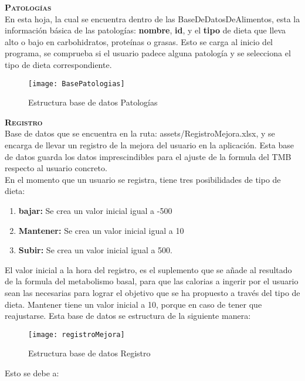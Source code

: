 \textbf{\textsc{Patologías}}\\
En esta hoja, la cual se encuentra dentro de las BaseDeDatosDeAlimentos, esta la información básica de las patologías: \textbf{nombre}, \textbf{id}, y el \textbf{tipo} de dieta que lleva alto o bajo en carbohidratos, proteínas o grasas. Esto se carga al inicio del programa, se comprueba si el usuario padece alguna patología y se selecciona el tipo de dieta correspondiente.\\
\begin{figure}[htb]
\centering
\texttt{[image: BasePatologias]} 
\caption{Estructura base de datos Patologías}
\end{figure}

\textbf{\textsc{Registro}}\\
Base de datos que se encuentra en la ruta: assets/RegistroMejora.xlsx, y se encarga de llevar un registro de la mejora del usuario en la aplicación. Esta base de datos guarda los datos imprescindibles para el ajuste de la formula del TMB respecto al usuario concreto.\\
En el momento que un usuario se registra, tiene tres posibilidades de tipo de dieta:
\begin{enumerate}
\item \textbf{bajar:} Se crea un valor inicial igual a -500
\item \textbf{Mantener:} Se crea un valor inicial igual a 10
\item \textbf{Subir:} Se crea un valor inicial igual a 500. 
\end{enumerate}
El valor inicial a la hora del registro, es el suplemento que se añade al resultado de la formula del metabolismo basal, para que las calorias a ingerir por el usuario sean las necesarias para lograr el objetivo que se ha propuesto a través del tipo de dieta. Mantener tiene un valor inicial a 10, porque en caso de tener que reajustarse.
Esta base de datos se estructura de la siguiente manera:
\begin{figure}[htb]
\centering
\texttt{[image: registroMejora]} 
\caption{Estructura base de datos Registro}
\end{figure}
Esto se debe a:

